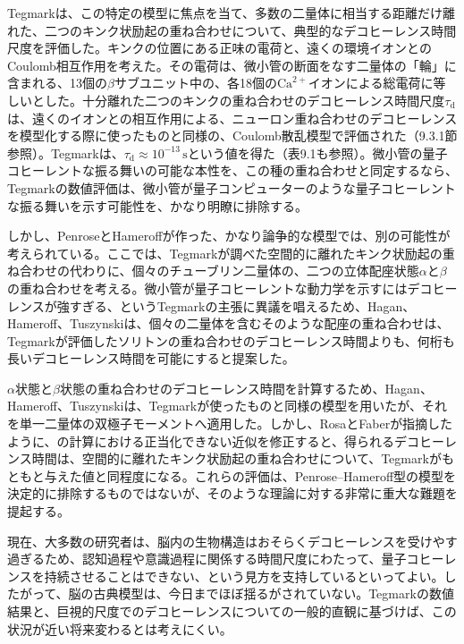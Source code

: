 \hypertarget{srcpage:374}{}\label{srcpage:374}
Tegmark\cite{ref515}は、この特定の模型に焦点を当て、多数の二量体に相当する距離だけ離れた、二つのキンク状励起の重ね合わせについて、典型的なデコヒーレンス時間尺度を評価した。キンクの位置にある正味の電荷と、遠くの環境イオンとのCoulomb相互作用を考えた。その電荷は、微小管の断面をなす二量体の「輪」に含まれる、13個の$\beta$サブユニット中の、各18個の$\mathrm{Ca}^{2+}$イオンによる総電荷に等しいとした。十分離れた二つのキンクの重ね合わせのデコヒーレンス時間尺度$\tau_{\mathrm d}$は、遠くのイオンとの相互作用による、ニューロン重ね合わせのデコヒーレンスを模型化する際に使ったものと同様の、Coulomb散乱模型で評価された（9.3.1節参照）。Tegmarkは、$\tau_{\mathrm d}\approx10^{-13}\,\mathrm s$という値を得た（表9.1も参照）。微小管の量子コヒーレントな振る舞いの可能な本性を、この種の重ね合わせと同定するなら、Tegmarkの数値評価は、微小管が量子コンピューターのような量子コヒーレントな振る舞いを示す可能性を、かなり明瞭に排除する。

しかし、PenroseとHameroff\cite{ref473,ref512,ref513}が作った、かなり論争的な模型では、別の可能性が考えられている。ここでは、Tegmarkが調べた空間的に離れたキンク状励起の重ね合わせの代わりに、個々のチューブリン二量体の、二つの立体配座状態$\alpha$と$\beta$の重ね合わせを考える。微小管が量子コヒーレントな動力学を示すにはデコヒーレンスが強すぎる、というTegmarkの主張に異議を唱えるため、Hagan、Hameroff、Tuszynski\cite{ref514}は、個々の二量体を含むそのような配座の重ね合わせは、Tegmarkが評価したソリトンの重ね合わせのデコヒーレンス時間よりも、何桁も長いデコヒーレンス時間を可能にすると提案した。

$\alpha$状態と$\beta$状態の重ね合わせのデコヒーレンス時間を計算するため、Hagan、Hameroff、Tuszynski\cite{ref514}は、Tegmarkが使ったものと同様の模型を用いたが、それを単一二量体の双極子モーメントへ適用した。しかし、RosaとFaber\cite{ref520}が指摘したように、\cite{ref514}の計算における正当化できない近似を修正すると、得られるデコヒーレンス時間は、空間的に離れたキンク状励起の重ね合わせについて、Tegmarkがもともと与えた値と同程度になる。これらの評価は、Penrose--Hameroff型の模型を決定的に排除するものではないが、そのような理論に対する非常に重大な難題を提起する。

現在、大多数の研究者は、脳内の生物構造はおそらくデコヒーレンスを受けやす過ぎるため、認知過程や意識過程に関係する時間尺度にわたって、量子コヒーレンスを持続させることはできない、という見方を支持しているといってよい\cite{ref521}。したがって、脳の古典模型は、今日までほぼ揺るがされていない。Tegmarkの数値結果と、巨視的尺度でのデコヒーレンスについての一般的直観に基づけば、この状況が近い将来変わるとは考えにくい。


